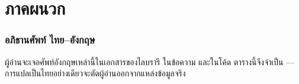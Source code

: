 \clearpage

\appendix
\part*{ภาคผนวก}

\makeatletter
\newcommand{\thaialph}[1]{\ifcase\value{#1}\or ก\or ข\or ค\or ง\or จ\or ฉ\fi}
\makeatother
\renewcommand{\thesection}{\thaialph{section}}

\section{อภิธานศัพท์ ไทย--อังกฤษ}

ผู้อ่านจะเจอศัพท์อังกฤษเหล่านี้ในเอกสารของไลบรารี ในข้อความ  และในโค้ด
ตารางนี้จึงจำเป็น --- การแปลเป็นไทยอย่างเดียวจะตัดผู้อ่านออกจากแหล่งข้อมูลจริง

